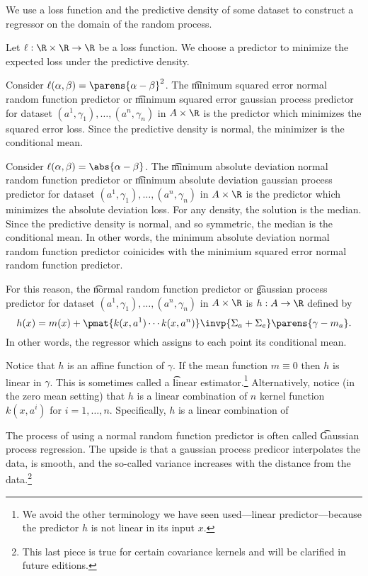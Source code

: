 

We use a loss function and the predictive density of some dataset to construct a regressor on the domain of the random process.


Let $\ell: \R \times \R \to \R$ be a loss function.
We choose a predictor to minimize the expected loss under the predictive density.

Consider $\ell(\alpha, \beta) = \parens{\alpha - \beta}^2$.
The \t{minimum squared error normal random function predictor} or \t{minimum squared error gaussian process predictor} for dataset $(a^1, \gamma_1), \dots, (a^n, \gamma_n)$ in $A \times \R$ is the predictor which minimizes the squared error loss.
Since the predictive density is normal, the minimizer is the conditional mean.

Consider $\ell(\alpha, \beta) = \abs{\alpha - \beta}$.
The \t{minimum absolute deviation normal random function predictor} or \t{minimum absolute deviation gaussian process predictor} for dataset $(a^1, \gamma_1), \dots, (a^n, \gamma_n)$ in $A \times \R$ is the predictor which minimizes the absolute deviation loss.
For any density, the solution is the median.
Since the predictive density is normal, and so symmetric, the median is the conditional mean.
In other words, the minimum absolute deviation normal random function predictor coinicides with the minimium squared error normal random function predictor.


For this reason, the \t{normal random function predictor} or \t{gaussian process predictor} for dataset $(a^1, \gamma_1), \dots, (a^n, \gamma_n)$ in $A \times \R$ is $h: A \to \R$ defined by
\[
  h(x) = m(x) + \pmat{k(x,a^1) \cdots k(x, a^n)}\invp{\Sigma_{a} + \Sigma_{e}}\parens{\gamma - m_{a}}.
\]
In other words, the regressor which assigns to each point its conditional mean.

Notice that $h$ is an affine function of $\gamma$.
If the mean function $m \equiv 0$ then $h$ is linear in $\gamma$.
This is sometimes called a \t{linear estimator}.\footnote{We avoid the other terminology we have seen used---linear predictor---because the predictor $h$ is not linear in its input $x$.}
Alternatively, notice (in the zero mean setting) that $h$ is a linear combination of $n$ kernel function $k(x, a^i)$ for $i = 1, \dots, n$.
Specifically, $h$ is a linear combination of

The process of using a normal random function predictor is often called \t{Gaussian process regression}.
The upside is that a gaussian process predicor interpolates the data, is smooth, and the so-called variance increases with the distance from the data.\footnote{This last piece is true for certain covariance kernels and will be clarified in future editions.}

\blankpage
